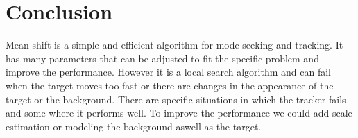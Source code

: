 \documentclass[9pt]{IEEEtran}
\begin{document}
\section{Conclusion}
Mean shift is a simple and efficient algorithm for mode seeking and tracking. It has many parameters that can be adjusted
to fit the specific problem and improve the performance. However it is a local search algorithm and can 
fail when the target moves too fast or there are changes in the appearance of the target or the background. 
There are specific situations in which the tracker fails and some where it performs well. To improve the performance
we could add scale estimation or modeling the background aswell as the target. 




\end{document}
